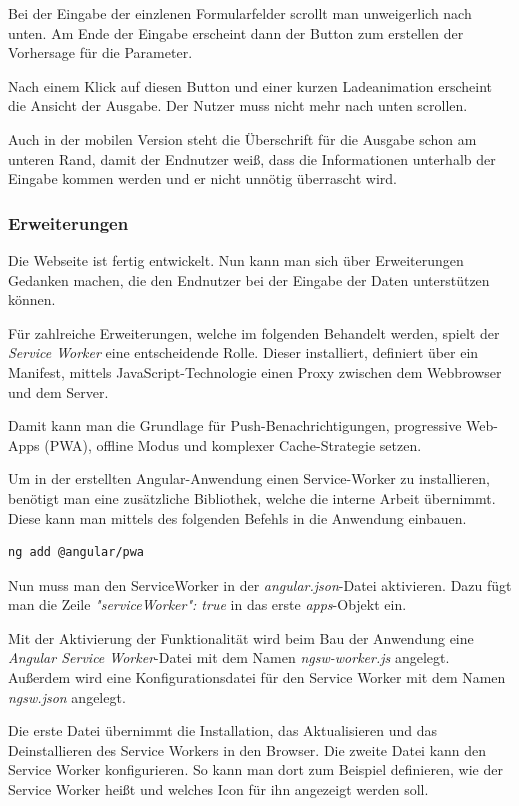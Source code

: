Bei der Eingabe der einzlenen Formularfelder scrollt man unweigerlich nach unten. Am Ende der Eingabe erscheint dann der
Button zum erstellen der Vorhersage für die Parameter.

Nach einem Klick auf diesen Button und einer kurzen Ladeanimation erscheint die Ansicht der Ausgabe. Der Nutzer muss
nicht mehr nach unten scrollen.

Auch in der mobilen Version steht die Überschrift für die Ausgabe schon am unteren Rand, damit der Endnutzer weiß, dass
die Informationen unterhalb der Eingabe kommen werden und er nicht unnötig überrascht wird.

\subsubsection{Erweiterungen}
Die Webseite ist fertig entwickelt. Nun kann man sich über Erweiterungen Gedanken machen, die den Endnutzer bei der
Eingabe der Daten unterstützen können.

Für zahlreiche Erweiterungen, welche im folgenden Behandelt werden, spielt der \textit{Service Worker} eine
entscheidende Rolle. Dieser installiert, definiert über ein Manifest, mittels JavaScript-Technologie einen Proxy
zwischen dem Webbrowser und dem Server.

Damit kann man die Grundlage für Push-Benachrichtigungen, progressive Web-Apps (PWA), offline Modus und komplexer
Cache-Strategie setzen.

Um in der erstellten Angular-Anwendung einen Service-Worker zu installieren, benötigt man eine zusätzliche Bibliothek,
welche die interne Arbeit übernimmt. Diese kann man mittels des folgenden Befehls in die Anwendung einbauen.

\begin{lstlisting}[caption=Hinzufügen der PWA-Bibliothek, label=ls:umsetzung_angularaddpwa]
    ng add @angular/pwa
\end{lstlisting}

Nun muss man den ServiceWorker in der \textit{angular.json}-Datei aktivieren. Dazu fügt man die Zeile
\textit{"serviceWorker": true} in das erste \textit{apps}-Objekt ein.

Mit der Aktivierung der Funktionalität wird beim Bau der Anwendung eine \textit{Angular Service Worker}-Datei mit dem
Namen \textit{ngsw-worker.js} angelegt. Außerdem wird eine Konfigurationsdatei für den Service Worker mit dem Namen
\textit{ngsw.json} angelegt.

Die erste Datei übernimmt die Installation, das Aktualisieren und das Deinstallieren des Service Workers in den Browser.
Die zweite Datei kann den Service Worker konfigurieren. So kann man dort zum Beispiel definieren, wie der Service Worker
heißt und welches Icon für ihn angezeigt werden soll.

